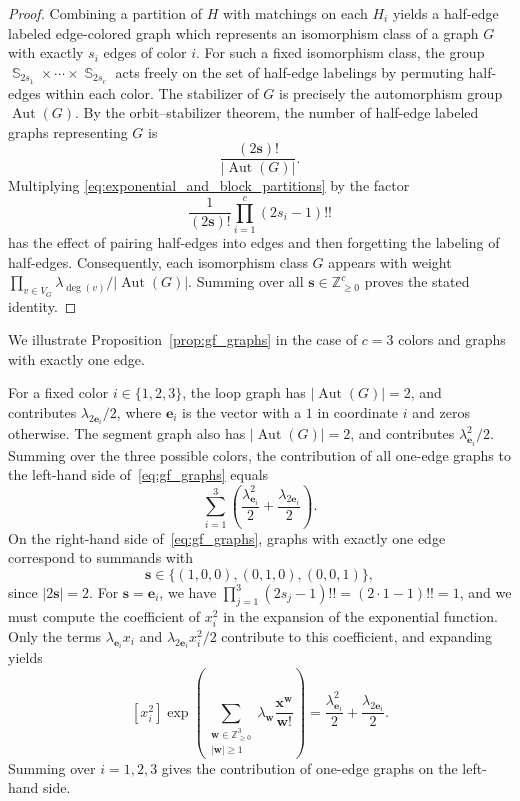 \documentclass[a4paper,oneside]{amsart}
\newcommand{\bb}[1]{\boldsymbol{#1}}
\numberwithin{theorem}{section}
\theoremstyle{remark}
\newenvironment{example}
{\pushQED{\qed}\renewcommand{\qedsymbol}{$\diamond$}\examplex}
{\popQED\endexamplex}
\newcommand{\Z}{\mathbb{Z}}
\DeclareMathOperator{\Aut}{Aut}
\DeclareMathOperator{\Sym}{\mathbb{S}}
\begin{document}
\begin{proof}
Combining a partition of $H$ with matchings on each $H_i$ yields a half-edge labeled
edge-colored graph which represents an isomorphism class of a graph $G$ 
with
exactly $s_i$ edges of color $i$.
For such a fixed isomorphism class, the group
$\Sym_{2s_1}\times\cdots\times\Sym_{2s_c}$
acts freely on the set of half-edge labelings by permuting half-edges within
each color.
The stabilizer of $G$ is precisely the automorphism group $\Aut(G)$.
By the orbit--stabilizer theorem, the number of half-edge labeled graphs representing $G$ is
\[
\frac{(2\bb s)!}{|\Aut(G)|}.
\]
Multiplying \eqref{eq:exponential_and_block_partitions} by the factor
\[
\frac{1}{(2\bb s)!}\prod_{i=1}^c(2s_i-1)!!
\]
has the effect of pairing half-edges into edges and then forgetting the labeling of
half-edges.
Consequently, each isomorphism class $G$ appears with weight
$\prod_{v\in V_G}\lambda_{\deg(v)}/|\Aut(G)|$.
Summing over all $\bb s\in\Z_{\ge0}^c$ proves the stated identity.
\end{proof}


\begin{example}
We illustrate Proposition~\ref{prop:gf_graphs} in the case of $c=3$ colors and graphs with exactly one edge.
%
For a fixed color $i\in\{1,2,3\}$, the loop graph has $|\Aut(G)|=2$, and contributes 
$\lambda_{2\bb e_i}/2$,
where $\bb e_i$ is the vector with a $1$ in coordinate $i$ and zeros otherwise.
The segment graph also has $|\Aut(G)|=2$, and contributes
$\lambda_{\bb e_i}^2/2$.
Summing over the three possible colors, the contribution of all one-edge graphs to the left-hand side of~\eqref{eq:gf_graphs} equals
\[
\sum_{i=1}^3\left(
\frac{\lambda_{\bb e_i}^2}{2}
+
\frac{\lambda_{2\bb e_i}}{2}
\right).
\]
On the right-hand side of~\eqref{eq:gf_graphs}, graphs with exactly one
edge correspond to summands with
\[
\bb s\in\{(1,0,0),(0,1,0),(0,0,1)\},
\]
since $|2 \bb s| = 2$.
For $\bb s=\bb e_i$, we have
$\prod_{j=1}^3(2s_j-1)!! = (2\cdot1-1)!!=1$,
and we must compute the coefficient of $x_i^2$ in the expansion of the exponential function.
Only the terms $\lambda_{\bb e_i}x_i$ and $\lambda_{2\bb e_i}x_i^2/2$ contribute to
this coefficient, and expanding yields
\[
[x_i^2]\exp\!\left(
\sum_{\substack{\bb w\in\Z_{\ge0}^3\\|\bb w|\ge1}}
\lambda_{\bb w}\frac{\bb x^{\bb w}}{\bb w!}
\right)
=
\frac{\lambda_{\bb e_i}^2}{2}
+
\frac{\lambda_{2\bb e_i}}{2}.
\]
Summing over $i=1,2,3$ gives the contribution of one-edge graphs on the left-hand side.
\end{example}
\end{document}
